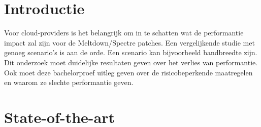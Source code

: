 
\section{Introductie} %
\label{sec:introductie}





Voor cloud-providers is het belangrijk om in te schatten wat de performantie impact zal zijn voor de Meltdown/Spectre patches.
Een vergelijkende studie met genoeg scenario's is aan de orde. Een scenario kan bijvoorbeeld bandbreedte zijn.
Dit onderzoek moet duidelijke resultaten geven over het verlies van performantie. Ook moet deze bachelorproef uitleg geven over de risicobeperkende maatregelen en waarom ze slechte performantie geven.


\section{State-of-the-art}
\label{sec:state-of-the-art}



